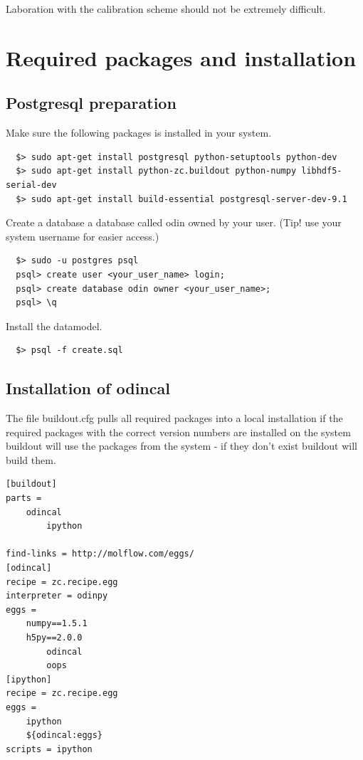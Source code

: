 \documentclass[12pt]{article}
\begin{document}
Laboration with the calibration scheme should not be extremely
difficult.
  
\section{Required packages and installation}

\subsection{Postgresql preparation}

Make sure the following packages is installed in your system.
\begin{verbatim}  
  $> sudo apt-get install postgresql python-setuptools python-dev
  $> sudo apt-get install python-zc.buildout python-numpy libhdf5-serial-dev
  $> sudo apt-get install build-essential postgresql-server-dev-9.1
\end{verbatim}

Create a database a database called odin owned by your user. (Tip! use your system username for easier access.)
  
\begin{verbatim}  
  $> sudo -u postgres psql
  psql> create user <your_user_name> login;
  psql> create database odin owner <your_user_name>;
  psql> \q
\end{verbatim}

Install the datamodel.

\begin{verbatim}  
  $> psql -f create.sql
\end{verbatim}

\subsection{Installation of odincal}

The file buildout.cfg pulls all required packages into a local installation if the required packages with the correct version numbers are installed on the system buildout will use the packages from the system - if they don't exist buildout will build them.

\begin{verbatim}
[buildout]
parts = 
	odincal
        ipython

find-links = http://molflow.com/eggs/
[odincal]
recipe = zc.recipe.egg
interpreter = odinpy
eggs = 	
	numpy==1.5.1
	h5py==2.0.0
        odincal
        oops
[ipython]
recipe = zc.recipe.egg
eggs =
    ipython
    ${odincal:eggs}
scripts = ipython
\end{verbatim}
\end{document}
